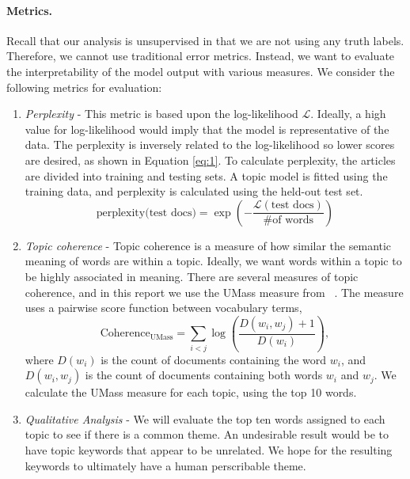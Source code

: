 \documentclass[10pt,twocolumn,letterpaper]{article}
\begin{document}
\paragraph{Metrics.} 
Recall that our analysis is unsupervised in that we are not using any truth labels.
Therefore, we cannot use traditional error metrics. 
Instead, we want to evaluate the interpretability of the model output with various measures.
We consider the following metrics for evaluation:
\begin{enumerate}\itemsep0pt
    \item \textit{Perplexity} - This metric is based upon the log-likelihood $\mathcal{L}$. 
    Ideally, a high value for log-likelihood would imply that the model is representative of the data.
    The perplexity is inversely related to the log-likelihood so lower scores are desired, as shown in Equation \eqref{eq:1}.
    To calculate perplexity, the articles are divided into training and testing sets. 
    A topic model is fitted using the training data, and perplexity is calculated using the held-out test set.
    \begin{equation}\label{eq:1}
        \text{perplexity(test docs)} = \exp{\left(-\frac{\mathcal{L}(\text{test docs})}{\text{\# of words}}\right)}
    \end{equation}
    
    \item \textit{Topic coherence} - Topic coherence is a measure of how similar the semantic meaning of words are within a topic. 
    Ideally, we want words within a topic to be highly associated in meaning.
    There are several measures of topic coherence, and in this report we use the UMass measure from ~\cite{mimno2011optimizing}.
    The measure uses a pairwise score function between vocabulary terms,
    \begin{equation} \label{eq:2}
        \text{Coherence}_{\text{UMass}} = \sum_{i<j}\log{\left(\frac{D(w_i,w_j) + 1}{D(w_i)}\right)},
    \end{equation}
    where $D(w_i)$ is the count of documents containing the word $w_i$, and $D(w_i,w_j)$ is the count of documents containing both words $w_i$ and $w_j$. 
    We calculate the UMass measure for each topic, using the top 10 words.
    \item \textit{Qualitative Analysis} - We will evaluate the top ten words assigned to each topic to see if there is a common theme. 
    An undesirable result would be to have topic keywords that appear to be unrelated.
    We hope for the resulting keywords to ultimately have a human perscribable theme.
\end{enumerate}
\end{document}
